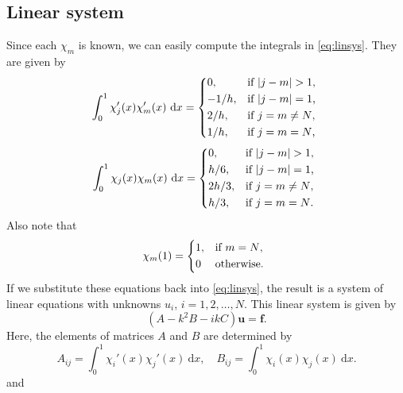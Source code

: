 \documentclass[a4paper]{article}
\newcommand{\dd}{\mathrm{d}}
\newcommand{\vct}{\mathbf}
\begin{document}
\subsection{Linear system}

Since each $\chi_m$ is known, we can easily compute the integrals in
\eqref{eq:linsys}. They are given by
\begin{equation*}
  \int^1_0 \chi_j'(x) \chi_m'(x) \ \dd x
    = \begin{dcases*}
        0,              & if $|j - m| > 1$,   \\
        - {1}/{h},  & if $|j - m| = 1$,   \\
        {2}/{h},    & if $j = m \neq N$,  \\
        {1}/{h},    & if $j = m = N$,
      \end{dcases*}
\end{equation*}
\begin{equation*}
  \int^1_0 \chi_j(x) \chi_m(x) \ \dd x
    = \begin{dcases*}
        0,    & if $|j - m| > 1$,   \\
        h/6,  & if $|j - m| = 1$,   \\
        2h/3, & if $j = m \neq N$,  \\
        h/3,  & if $j = m = N$.
      \end{dcases*}
\end{equation*}
Also note that
\begin{equation*}
  \chi_m(1)
  = \begin{dcases*}
      1, & if $m = N$, \\
      0  & otherwise.
    \end{dcases*}
\end{equation*}
If we substitute these equations back into \eqref{eq:linsys}, the
result is a system of linear equations with unknowns $u_i$, $i = 1, 2,
\ldots, N$. This linear system is given by
\begin{equation}
  (A - k^2 B - i k C)\vct{u} = \vct{f}.
\end{equation}
Here, the elements of matrices $A$ and $B$ are determined by
\begin{equation}
  A_{i j} = \int^1_0 \chi_i'(x) \chi_j'(x) \ \dd x, \quad
  B_{i j} = \int^1_0 \chi_i(x) \chi_j(x) \ \dd x.
\end{equation}
and
\end{document}
